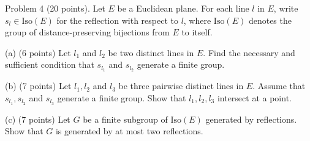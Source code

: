 \begin{exercise}
\label{algebra:2016:4}
Problem 4 (20 points). Let $E$ be a Euclidean plane. For each line $l$ in $E$, write $s_l \in \mathrm{Iso}(E)$ for the reflection with respect to $l$, where $\mathrm{Iso}(E)$ denotes the group of distance-preserving bijections from $E$ to itself.

(a) (6 points) Let $l_1$ and $l_2$ be two distinct lines in $E$. Find the necessary and sufficient condition that $s_{l_1}$ and $s_{l_2}$ generate a finite group.

(b) (7 points) Let $l_1, l_2$ and $l_3$ be three pairwise distinct lines in $E$. Assume that $s_{l_1}, s_{l_2}$ and $s_{l_3}$ generate a finite group. Show that $l_1, l_2, l_3$ intersect at a point.

(c) (7 points) Let $G$ be a finite subgroup of $\mathrm{Iso}(E)$ generated by reflections. Show that $G$ is generated by at most two reflections.
\end{exercise}
